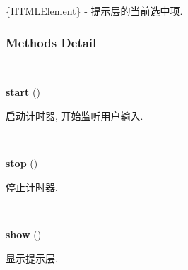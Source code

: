 \documentclass[letterpaper,10pt,english]{sphinxmanual}
\begin{document}

\begin{fulllineitems}
\label{api/component/suggest/index:Suggest.selectedItem}
\{HTMLElement\} - 提示层的当前选中项.

\end{fulllineitems}



\subsubsection{Methods Detail}
\label{api/component/suggest/index:methods-detail}

\begin{fulllineitems}
\label{api/component/suggest/index:Suggest.start}~
\begin{DUlineblock}{0em}
\item[] \textbf{start} ()
\item[] 启动计时器, 开始监听用户输入.
\end{DUlineblock}

\end{fulllineitems}



\begin{fulllineitems}
\label{api/component/suggest/index:Suggest.stop}~
\begin{DUlineblock}{0em}
\item[] \textbf{stop} ()
\item[] 停止计时器.
\end{DUlineblock}

\end{fulllineitems}



\begin{fulllineitems}
\label{api/component/suggest/index:Suggest.show}~
\begin{DUlineblock}{0em}
\item[] \textbf{show} ()
\item[] 显示提示层.
\end{DUlineblock}

\end{fulllineitems}
\end{document}
